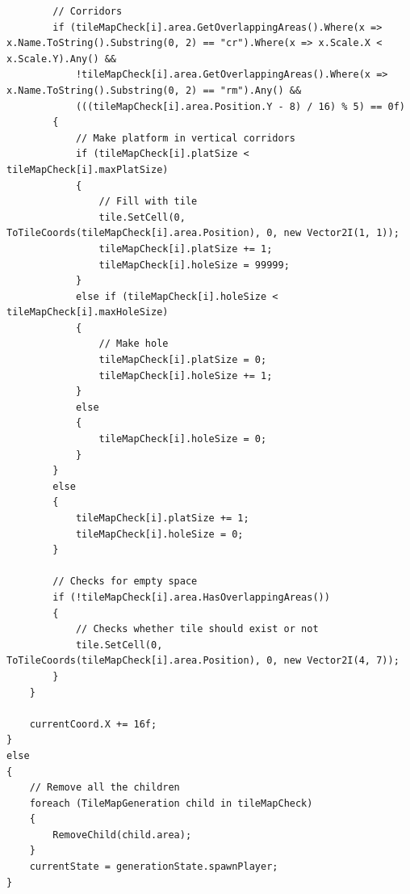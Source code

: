 \documentclass{article}
\begin{document}
\begin{lstlisting}
        // Corridors
        if (tileMapCheck[i].area.GetOverlappingAreas().Where(x => x.Name.ToString().Substring(0, 2) == "cr").Where(x => x.Scale.X < x.Scale.Y).Any() &&
            !tileMapCheck[i].area.GetOverlappingAreas().Where(x => x.Name.ToString().Substring(0, 2) == "rm").Any() &&
            (((tileMapCheck[i].area.Position.Y - 8) / 16) % 5) == 0f)
        {
            // Make platform in vertical corridors
            if (tileMapCheck[i].platSize < tileMapCheck[i].maxPlatSize)
            {
                // Fill with tile
                tile.SetCell(0, ToTileCoords(tileMapCheck[i].area.Position), 0, new Vector2I(1, 1));
                tileMapCheck[i].platSize += 1;
                tileMapCheck[i].holeSize = 99999;
            }
            else if (tileMapCheck[i].holeSize < tileMapCheck[i].maxHoleSize)
            {
                // Make hole
                tileMapCheck[i].platSize = 0;
                tileMapCheck[i].holeSize += 1;
            }
            else
            {
                tileMapCheck[i].holeSize = 0;
            }
        }
        else
        {
            tileMapCheck[i].platSize += 1;
            tileMapCheck[i].holeSize = 0;
        }

        // Checks for empty space
        if (!tileMapCheck[i].area.HasOverlappingAreas())
        {
            // Checks whether tile should exist or not
            tile.SetCell(0, ToTileCoords(tileMapCheck[i].area.Position), 0, new Vector2I(4, 7));
        }
    }

    currentCoord.X += 16f;
}
else
{
    // Remove all the children
    foreach (TileMapGeneration child in tileMapCheck)
    {
        RemoveChild(child.area);
    }
    currentState = generationState.spawnPlayer;
}
\end{lstlisting}
\end{document}
